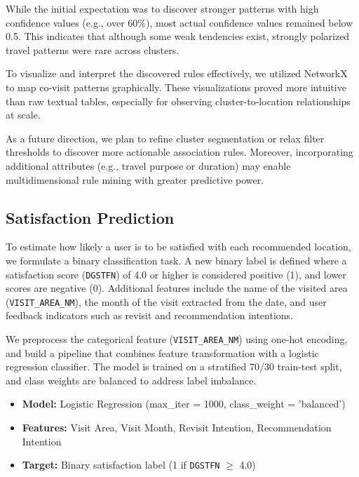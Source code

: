 \documentclass[sigconf]{acmart}
\begin{document}
\begin{CJK}{UTF8}{mj}
While the initial expectation was to discover stronger patterns with high confidence values (e.g., over 60\%), most actual confidence values remained below 0.5. This indicates that although some weak tendencies exist, strongly polarized travel patterns were rare across clusters.

To visualize and interpret the discovered rules effectively, we utilized NetworkX to map co-visit patterns graphically. These visualizations proved more intuitive than raw textual tables, especially for observing cluster-to-location relationships at scale.

As a future direction, we plan to refine cluster segmentation or relax filter thresholds to discover more actionable association rules. Moreover, incorporating additional attributes (e.g., travel purpose or duration) may enable multidimensional rule mining with greater predictive power.



\subsection{Satisfaction Prediction}

To estimate how likely a user is to be satisfied with each recommended location, we formulate a binary classification task. A new binary label is defined where a satisfaction score (\texttt{DGSTFN}) of 4.0 or higher is considered positive (1), and lower scores are negative (0). Additional features include the name of the visited area (\texttt{VISIT\_AREA\_NM}), the month of the visit extracted from the date, and user feedback indicators such as revisit and recommendation intentions.

We preprocess the categorical feature (\texttt{VISIT\_AREA\_NM}) using one-hot encoding, and build a pipeline that combines feature transformation with a logistic regression classifier. The model is trained on a stratified 70/30 train-test split, and class weights are balanced to address label imbalance.

\begin{itemize}
  \item \textbf{Model:} Logistic Regression (max\_iter = 1000, class\_weight = 'balanced')
  \item \textbf{Features:} Visit Area, Visit Month, Revisit Intention, Recommendation Intention
  \item \textbf{Target:} Binary satisfaction label (1 if \texttt{DGSTFN} $\geq$ 4.0)
\end{itemize}


\end{CJK}
\end{document}
